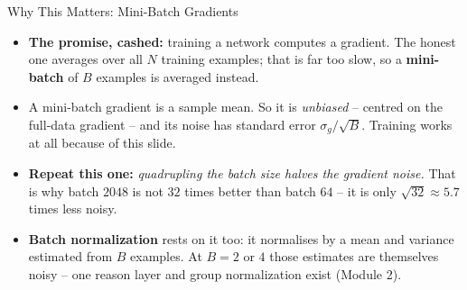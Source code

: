 \begin{frame}{Why This Matters: Mini-Batch Gradients}
\begin{itemize}
  \item \textbf{The promise, cashed:} training a network computes a gradient. The honest one averages over all $N$ training examples; that is far too slow, so a \textbf{mini-batch} of $B$ examples is averaged instead.
  \pause
  \item A mini-batch gradient is a sample mean. So it is \emph{unbiased} -- centred on the full-data gradient -- and its noise has standard error $\sigma_g/\sqrt{B}$. Training works at all because of this slide.
  \pause
  \item \textbf{Repeat this one:} \emph{quadrupling the batch size halves the gradient noise.} That is why batch $2048$ is not $32$ times better than batch $64$ -- it is only $\sqrt{32} \approx 5.7$ times less noisy.
  \pause
  \item \textbf{Batch normalization} rests on it too: it normalises by a mean and variance estimated from $B$ examples. At $B = 2$ or $4$ those estimates are themselves noisy -- one reason layer and group normalization exist (Module 2).
\end{itemize}
\end{frame}
